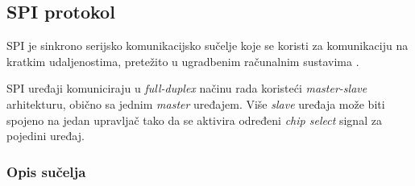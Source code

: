 \subsection{SPI protokol}

SPI je sinkrono serijsko komunikacijsko sučelje koje se koristi za komunikaciju na kratkim udaljenostima, pretežito u ugradbenim računalnim sustavima \cite{spi_wikipedia}. 

SPI uređaji komuniciraju u \textit{full-duplex} načinu rada koristeći \textit{master-slave} arhitekturu, obično sa jednim \textit{master} uređajem. Više \textit{slave} uređaja može biti spojeno na jedan upravljač tako da se aktivira određeni \textit{chip select} signal za pojedini uređaj.

\subsubsection{Opis sučelja}


